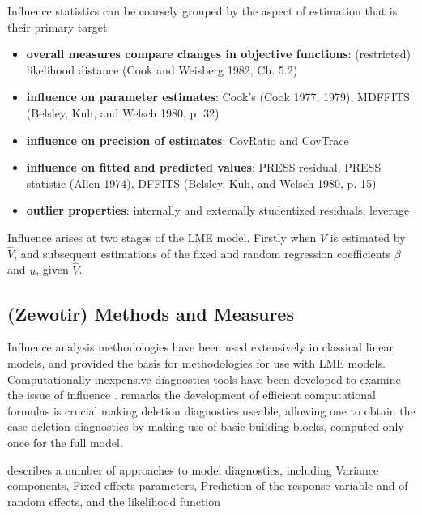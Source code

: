 \documentclass[12pt, a4paper]{report}
\theoremstyle{plain}
\theoremstyle{definition}
\theoremstyle{remark}
\begin{document}
Influence statistics can be coarsely grouped by the aspect of estimation that is their primary target:
\begin{itemize}
	\item \textbf{overall measures compare changes in objective functions}: (restricted) likelihood distance (Cook and Weisberg 1982, Ch. 5.2)
	\item \textbf{influence on parameter estimates}: Cook's  (Cook 1977, 1979), MDFFITS (Belsley, Kuh, and Welsch 1980, p. 32)
	\item \textbf{influence on precision of estimates}: CovRatio and CovTrace
	\item \textbf{influence on fitted and predicted values}: PRESS residual, PRESS statistic (Allen 1974), DFFITS (Belsley, Kuh, and Welsch 1980, p. 15)
	\item \textbf{outlier properties}: internally and externally studentized residuals, leverage
\end{itemize}

Influence arises at two stages of the LME model. Firstly when $V$ is estimated by $\hat{V}$, and subsequent
estimations of the fixed and random regression coefficients $\beta$ and $u$, given $\hat{V}$.


\subsection{(Zewotir) Methods and Measures}
Influence analysis methodologies have been used extensively in classical linear models, and provided the basis for methodologies for use with LME models. Computationally inexpensive diagnostics tools have been developed to examine the issue of influence \citep{tewomir}. 
\citet{tewomir} remarks the development of efficient computational formulas is crucial making deletion diagnostics useable, allowing one to obtain the  case deletion diagnostics by making use of basic building blocks, computed only once for the full model.




\citet{Zewotir} describes a number of approaches to model diagnostics, including Variance components, Fixed effects parameters, Prediction of the response variable and of random effects, and the likelihood function
\end{document}
